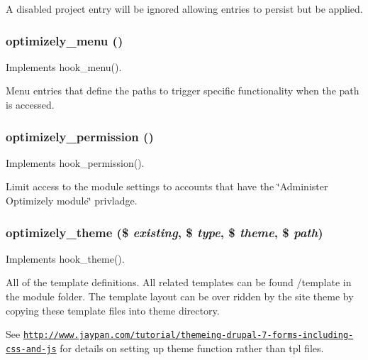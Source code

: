 A disabled project entry will be ignored allowing entries to persist but be applied. \hypertarget{optimizely_8module_a7411f84b7853003b0d2f0194ae41a0df}{
\subsubsection[{optimizely\_\-menu}]{\setlength{\rightskip}{0pt plus 5cm}optimizely\_\-menu ()}}
\label{optimizely_8module_a7411f84b7853003b0d2f0194ae41a0df}
Implements hook\_\-menu().

Menu entries that define the paths to trigger specific functionality when the path is accessed. \hypertarget{optimizely_8module_ae89dab888e84b13295533fcbc7117183}{
\subsubsection[{optimizely\_\-permission}]{\setlength{\rightskip}{0pt plus 5cm}optimizely\_\-permission ()}}
\label{optimizely_8module_ae89dab888e84b13295533fcbc7117183}
Implements hook\_\-permission().

Limit access to the module settings to accounts that have the \char`\"{}Administer Optimizely module\char`\"{} privladge. \hypertarget{optimizely_8module_ae230656a97c5bda735c774bad1380d77}{
\subsubsection[{optimizely\_\-theme}]{\setlength{\rightskip}{0pt plus 5cm}optimizely\_\-theme (\$ {\em existing}, \/  \$ {\em type}, \/  \$ {\em theme}, \/  \$ {\em path})}}
\label{optimizely_8module_ae230656a97c5bda735c774bad1380d77}
Implements hook\_\-theme().

All of the template definitions. All related templates can be found /template in the module folder. The template layout can be over ridden by the site theme by copying these template files into theme directory.

See \href{http://www.jaypan.com/tutorial/themeing-drupal-7-forms-including-css-and-js}{\tt http://www.jaypan.com/tutorial/themeing-\/drupal-\/7-\/forms-\/including-\/css-\/and-\/js} for details on setting up theme function rather than tpl files. 